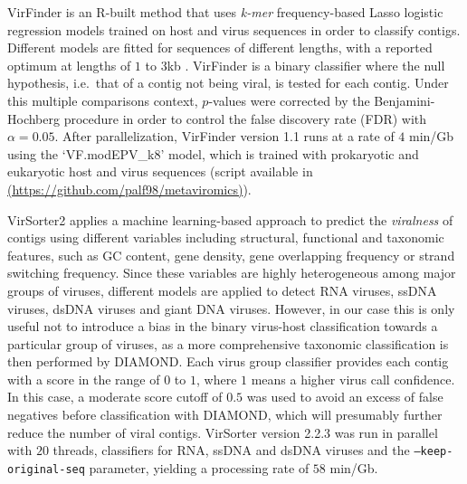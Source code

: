 \documentclass[
  openany]{book}
\begin{document}
VirFinder is an R-built method that uses \emph{k-mer} frequency-based Lasso logistic regression models trained on host and virus sequences in order to classify contigs. Different models are fitted for sequences of different lengths, with a reported optimum at lengths of \(1\) to \(3\)kb \autocite{Ren2017}. VirFinder is a binary classifier where the null hypothesis, i.e.~that of a contig not being viral, is tested for each contig. Under this multiple comparisons context, \(p\)-values were corrected by the Benjamini-Hochberg procedure in order to control the false discovery rate (FDR) with \(\alpha = 0.05\). After parallelization, VirFinder version 1.1 runs at a rate of \(4\) min/Gb using the `VF.modEPV\_k8' model, which is trained with prokaryotic and eukaryotic host and virus sequences (script available in \href{https://github.com/palf98/metaviromics}{(https://github.com/palf98/metaviromics)}).

VirSorter2 applies a machine learning-based approach to predict the \emph{viralness} of contigs using different variables including structural, functional and taxonomic features, such as GC content, gene density, gene overlapping frequency or strand switching frequency. Since these variables are highly heterogeneous among major groups of viruses, different models are applied to detect RNA viruses, ssDNA viruses, dsDNA viruses and giant DNA viruses. However, in our case this is only useful not to introduce a bias in the binary virus-host classification towards a particular group of viruses, as a more comprehensive taxonomic classification is then performed by DIAMOND. Each virus group classifier provides each contig with a score in the range of \(0\) to \(1\), where \(1\) means a higher virus call confidence. In this case, a moderate score cutoff of \(0.5\) was used to avoid an excess of false negatives before classification with DIAMOND, which will presumably further reduce the number of viral contigs. VirSorter version 2.2.3 was run in parallel with \(20\) threads, classifiers for RNA, ssDNA and dsDNA viruses and the \texttt{--keep-original-seq} parameter, yielding a processing rate of \(58\) min/Gb.
\end{document}
